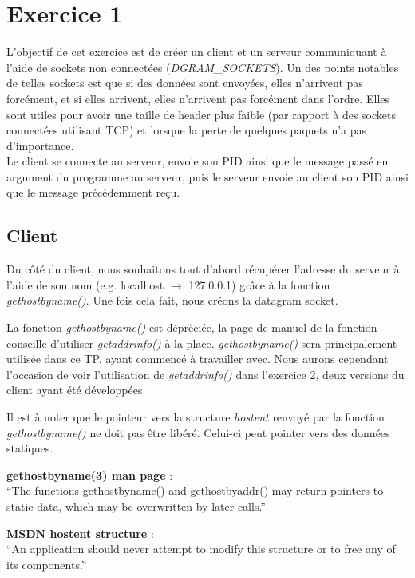 \section{Exercice 1}
L'objectif de cet exercice est de créer un client et un serveur communiquant à l'aide de sockets non connectées (\emph{DGRAM\_SOCKETS}). Un des points notables de telles sockets est que si des données sont envoyées, elles n'arrivent pas forcément, et si elles arrivent, elles n'arrivent pas forcément dans l'ordre. Elles sont utiles pour avoir une taille de header plus faible (par rapport à des sockets connectées utilisant TCP) et lorsque la perte de quelques paquets n'a pas d'importance.\\

Le client se connecte au serveur, envoie son PID ainsi que le message passé en argument du programme au serveur, puis le serveur envoie au client son PID ainsi que le message précédemment reçu.

\subsection{Client}
Du côté du client, nous souhaitons tout d'abord récupérer l'adresse du serveur à l'aide de son nom (e.g. localhost $\rightarrow$ 127.0.0.1) grâce à la fonction \emph{gethostbyname()}. Une fois cela fait, nous créons la datagram socket.\\

\begin{mdframed}[backgroundcolor=hintbg, linecolor=hintborder]
La fonction \emph{gethostbyname()} est dépréciée, la page de manuel de la fonction conseille d'utiliser \emph{getaddrinfo()} à la place. \emph{gethostbyname()} sera principalement utilisée dans ce TP, ayant commencé à travailler avec. Nous aurons cependant l'occasion de voir l'utilisation de \emph{getaddrinfo()} dans l'exercice 2, deux versions du client ayant été développées.
\end{mdframed}

\begin{mdframed}[backgroundcolor=lightblue2, linecolor=darkblue]
Il est à noter que le pointeur vers la structure \emph{hostent} renvoyé par la fonction \emph{gethostbyname()} ne doit pas être libéré. Celui-ci peut pointer vers des données statiques.

\begin{mdframed}[backgroundcolor=lightblue, linecolor=darkblue]
	\textbf{gethostbyname(3) man page} :\\
	``The functions gethostbyname() and gethostbyaddr() may  return  pointers to  static  data, which may be overwritten by later calls.'' \cite{cite:man_gethostbyname}
\end{mdframed}
\begin{mdframed}[backgroundcolor=lightblue, linecolor=darkblue]
	\noindent\textbf{MSDN hostent structure} :\\
	``An application should never attempt to modify this structure or to free any of its components.'' \cite{cite:msdn_hostent}
\end{mdframed}
\end{mdframed}
\

